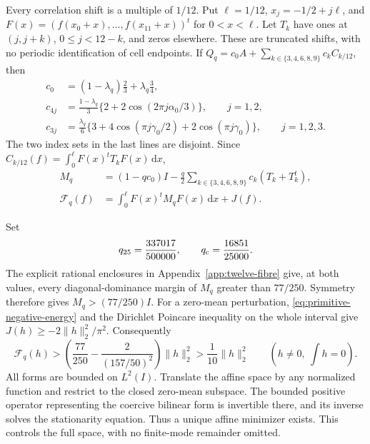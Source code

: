 \documentclass[11pt,reqno]{amsart}
\numberwithin{equation}{section}
\newcommand{\dd}{\,\mathrm d}
\begin{document}
Every correlation shift is a multiple of $1/12$.
Put $\ell=1/12$, $x_j=-1/2+j\ell$, and
$F(x)=(f(x_0+x),\ldots,f(x_{11}+x))^t$ for $0<x<\ell$.
Let $T_k$ have ones at $(j,j+k)$, $0\le j<12-k$, and zeros
elsewhere. These are truncated shifts, with no periodic
identification of cell endpoints. If
$Q_q=c_0A+\sum_{k\in\{3,4,6,8,9\}}c_kC_{k/12}$, then
\begin{equation}
 \begin{split}
 c_0&=(1-\lambda_q)\frac23+\lambda_q\frac34,\\
 c_{4j}&=\frac{1-\lambda_q}{3}
       \{2+2\cos(2\pi j\alpha_0/3)\},\qquad j=1,2,\\
 c_{3j}&=\frac{\lambda_q}{6}
       \{3+4\cos(\pi j\gamma_0/2)+2\cos(\pi j\gamma_0)\},
       \qquad j=1,2,3.
 \end{split}
 \label{eq:twelve-coefficients}
\end{equation}
The two index sets in the last lines are disjoint.
Since $C_{k/12}(f)=\int_0^\ell F(x)^tT_kF(x)\dd x$,
\begin{equation}
 \begin{split}
 M_q&=(1-qc_0)I-\frac q2\sum_{k\in\{3,4,6,8,9\}}
                         c_k(T_k+T_k^t),\\
 \mathcal F_q(f)&=\int_0^\ell F(x)^tM_qF(x)\dd x+J(f).
 \end{split}
 \label{eq:twelve-matrix}
\end{equation}

Set
\begin{equation}
 q_{25}=\frac{337017}{500000},\qquad
 q_{\rm c}=\frac{16851}{25000}.
 \label{eq:twelve-test-values}
\end{equation}
The explicit rational enclosures in Appendix~\ref{app:twelve-fibre}
give, at both values, every diagonal-dominance margin of $M_q$
greater than $77/250$. Symmetry therefore gives
$M_q>(77/250)I$. For a zero-mean perturbation,
\eqref{eq:primitive-negative-energy} and the Dirichlet
Poincare inequality on the whole interval give
$J(h)\ge-2\|h\|_2^2/\pi^2$. Consequently
\begin{equation}
 \mathcal F_q(h)>
 \left(\frac{77}{250}-\frac2{(157/50)^2}\right)\|h\|_2^2
 >\frac1{10}\|h\|_2^2\qquad(h\ne0,\ \int h=0).
 \label{eq:twelve-coercivity}
\end{equation}
All forms are bounded on $L^2(I)$. Translate the affine space
by any normalized function and restrict to the closed
zero-mean subspace. The bounded positive operator representing
the coercive bilinear form is invertible there, and its inverse
solves the stationarity equation. Thus a unique affine
minimizer exists. This controls the full space, with no
finite-mode remainder omitted.
\end{document}
